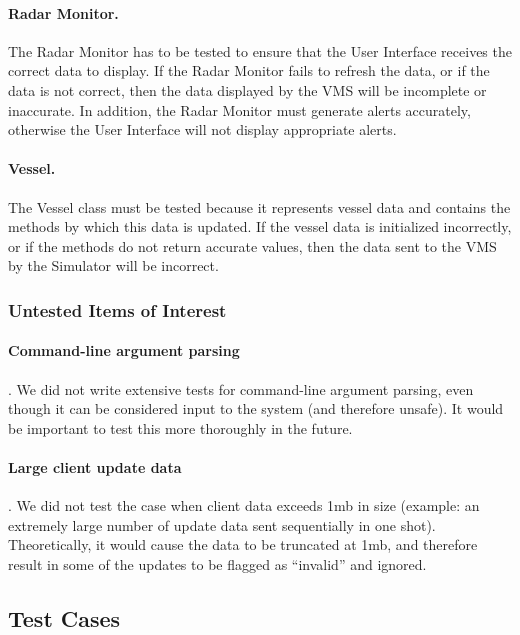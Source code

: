 \documentclass{article}
\begin{document}
\paragraph{Radar Monitor.} The Radar Monitor has to be tested to ensure that the User Interface receives the correct data to display. If the Radar Monitor fails to refresh the data, or if the data is not correct, then the data displayed by the VMS will be incomplete or inaccurate. In addition, the Radar Monitor must generate alerts accurately, otherwise the User Interface will not display appropriate alerts.

\paragraph{Vessel.} The Vessel class must be tested because it represents vessel data and contains the methods by which this data is updated. If the vessel data is initialized incorrectly, or if the methods do not return accurate values, then the data sent to the VMS by the Simulator will be incorrect.

\subsubsection{Untested Items of Interest} %


\paragraph{Command-line argument parsing}. We did not write extensive tests for command-line argument parsing, even though it can be considered input to the system (and therefore unsafe). It would be important to test this more thoroughly in the future.

\paragraph{Large client update data}. We did not test the case when client data exceeds 1mb in size (example: an extremely large number of update data sent sequentially in one shot). Theoretically, it would cause the data to be truncated at 1mb, and therefore result in some of the updates to be flagged as ``invalid'' and ignored.

\subsection{Test Cases}
\end{document}
